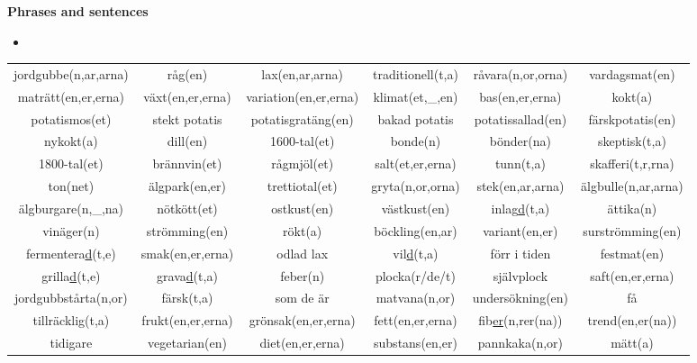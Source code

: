
\begin{flushleft}
    \textbf{Phrases and sentences}
    \begin{itemize}
        \item 
    \end{itemize}
\end{flushleft}

\begin{center}
    \begin{adjustwidth}{-2.5cm}{}
        \begin{tabular}{|c c c c c c|}
            \hline
            jordgubbe(n,ar,arna) & råg(en) & lax(en,ar,arna) & traditionell(t,a) & råvara(n,or,orna) & vardagsmat(en) \\
            maträtt(en,er,erna) & växt(en,er,erna) & variation(en,er,erna) & klimat(et,\_,en) & bas(en,er,erna) & kokt(a) \\
            potatismos(et) & stekt potatis & potatisgratäng(en) & bakad potatis & potatissallad(en) & färskpotatis(en) \\
            nykokt(a) & dill(en) & 1600-tal(et) & bonde(n) & bönder(na) & skeptisk(t,a) \\
            1800-tal(et) & brännvin(et) & rågmjöl(et) & salt(et,er,erna) & tunn(t,a) & skafferi(t,r,rna) \\
            ton(net) & älgpark(en,er) & trettiotal(et) & gryta(n,or,orna) & stek(en,ar,arna) & älgbulle(n,ar,arna) \\
            älgburgare(n,\_,na) & nötkött(et) & ostkust(en) & västkust(en) & inlag\underline{d}(t,a) & ättika(n) \\
            vinäger(n) & strömming(en) & rökt(a) & böckling(en,ar) & variant(en,er) & surströmming(en) \\
            fermentera\underline{d}(t,e) & smak(en,er,erna) & odlad lax & vil\underline{d}(t,a) & förr i tiden & festmat(en) \\
            grilla\underline{d}(t,e) & grava\underline{d}(t,a) & feber(n) & plocka(r/de/t) & självplock & saft(en,er,erna) \\
            jordgubbstårta(n,or) & färsk(t,a) & som de är & matvana(n,or) & undersökning(en) & få \\
            tillräcklig(t,a) & frukt(en,er,erna) & grönsak(en,er,erna) & fett(en,er,erna) & fib\underline{er}(n,rer(na)) & trend(en,er(na)) \\
            tidigare & vegetarian(en) & diet(en,er,erna) & substans(en,er) & pannkaka(n,or) & mätt(a) \\

\end{tabular}
\end{adjustwidth}
\end{center}

